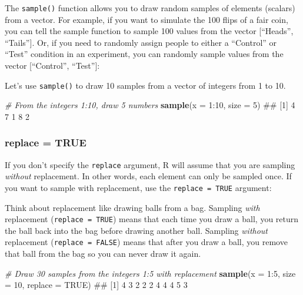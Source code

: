 \documentclass[]{book}
\newenvironment{Shaded}{\begin{snugshade}}{\end{snugshade}}
\newcommand{\KeywordTok}[1]{\textcolor[rgb]{0.13,0.29,0.53}{\textbf{{#1}}}}
\newcommand{\DataTypeTok}[1]{\textcolor[rgb]{0.13,0.29,0.53}{{#1}}}
\newcommand{\DecValTok}[1]{\textcolor[rgb]{0.00,0.00,0.81}{{#1}}}
\newcommand{\CommentTok}[1]{\textcolor[rgb]{0.56,0.35,0.01}{\textit{{#1}}}}
\newcommand{\OtherTok}[1]{\textcolor[rgb]{0.56,0.35,0.01}{{#1}}}
\newcommand{\NormalTok}[1]{{#1}}
\theoremstyle{definition}
\theoremstyle{definition}
\theoremstyle{remark}
\begin{document}
The \texttt{sample()} function allows you to draw random samples of
elements (scalars) from a vector. For example, if you want to simulate
the 100 flips of a fair coin, you can tell the sample function to sample
100 values from the vector {[}``Heads'', ``Tails''{]}. Or, if you need
to randomly assign people to either a ``Control'' or ``Test'' condition
in an experiment, you can randomly sample values from the vector
{[}``Control'', ``Test''{]}:

Let's use \texttt{sample()} to draw 10 samples from a vector of integers
from 1 to 10.

\begin{Shaded}
\begin{Highlighting}[]
\CommentTok{# From the integers 1:10, draw 5 numbers}
\KeywordTok{sample}\NormalTok{(}\DataTypeTok{x =} \DecValTok{1}\NormalTok{:}\DecValTok{10}\NormalTok{, }\DataTypeTok{size  =} \DecValTok{5}\NormalTok{)}
\NormalTok{## [1] 4 7 1 8 2}
\end{Highlighting}
\end{Shaded}

\subsubsection{replace = TRUE}\label{replace-true}

If you don't specify the \texttt{replace} argument, R will assume that
you are sampling \emph{without} replacement. In other words, each
element can only be sampled once. If you want to sample with
replacement, use the \texttt{replace\ =\ TRUE} argument:

Think about replacement like drawing balls from a bag. Sampling
\emph{with} replacement (\texttt{replace\ =\ TRUE}) means that each time
you draw a ball, you return the ball back into the bag before drawing
another ball. Sampling \emph{without} replacement
(\texttt{replace\ =\ FALSE}) means that after you draw a ball, you
remove that ball from the bag so you can never draw it again.

\begin{Shaded}
\begin{Highlighting}[]
\CommentTok{# Draw 30 samples from the integers 1:5 with replacement}
\KeywordTok{sample}\NormalTok{(}\DataTypeTok{x =} \DecValTok{1}\NormalTok{:}\DecValTok{5}\NormalTok{, }\DataTypeTok{size =} \DecValTok{10}\NormalTok{, }\DataTypeTok{replace =} \OtherTok{TRUE}\NormalTok{)}
\NormalTok{##  [1] 4 3 2 2 2 4 4 4 5 3}
\end{Highlighting}
\end{Shaded}
\end{document}
